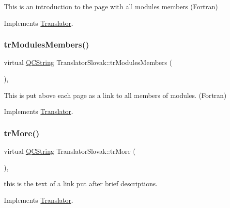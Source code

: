 This is an introduction to the page with all modules members (Fortran) 

Implements \mbox{\hyperlink{class_translator}{Translator}}.

\mbox{\label{class_translator_slovak_a024a828b40f9c7881af2894286a0eba1}} 
\subsubsection{\texorpdfstring{trModulesMembers()}{trModulesMembers()}}
{\footnotesize\ttfamily virtual \mbox{\hyperlink{class_q_c_string}{Q\+C\+String}} Translator\+Slovak\+::tr\+Modules\+Members (\begin{DoxyParamCaption}{ }\end{DoxyParamCaption})\hspace{0.3cm}{\ttfamily [inline]}, {\ttfamily [virtual]}}

This is put above each page as a link to all members of modules. (Fortran) 

Implements \mbox{\hyperlink{class_translator}{Translator}}.

\mbox{\label{class_translator_slovak_a93cc2233a9c0d500d8d4c0f09d93ec04}} 
\subsubsection{\texorpdfstring{trMore()}{trMore()}}
{\footnotesize\ttfamily virtual \mbox{\hyperlink{class_q_c_string}{Q\+C\+String}} Translator\+Slovak\+::tr\+More (\begin{DoxyParamCaption}{ }\end{DoxyParamCaption})\hspace{0.3cm}{\ttfamily [inline]}, {\ttfamily [virtual]}}

this is the text of a link put after brief descriptions. 

Implements \mbox{\hyperlink{class_translator}{Translator}}.

\mbox{\label{class_translator_slovak_ad30e7dbaa726798b6625f2159a2a02ae}} 
